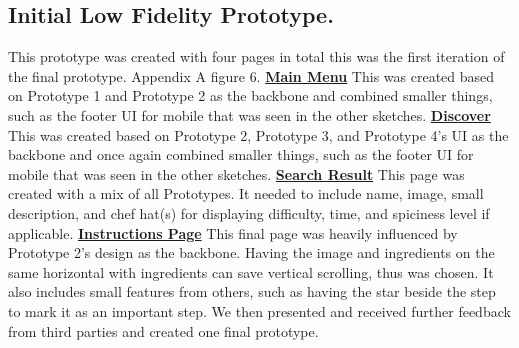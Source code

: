 \documentclass[11pt,english]{article}
\begin{document}
\subsection{Initial Low Fidelity Prototype.}
This prototype was created with four pages in total this was the first iteration of the final prototype. Appendix A figure 6. 
\newline
\newline
\textbf{\underline{Main Menu}}
\newline
\newline
This was created based on Prototype 1 and Prototype 2 as the backbone and combined smaller things, such as the footer UI for mobile that was seen in the other sketches.
\newline
\newline
\textbf{\underline{Discover}}
\newline
\newline
This was created based on Prototype 2, Prototype 3, and Prototype 4’s UI as the backbone and once again combined smaller things, such as the footer UI for mobile that was seen in the other sketches. 
\newline
\newline
\textbf{\underline{Search Result}}
\newline
\newline
This page was created with a mix of all Prototypes. It needed to include name, image, small description, and chef hat(s) for displaying difficulty, time, and spiciness level if applicable.
\newline
\newline
\textbf{\underline{Instructions Page}}
\newline
\newline
This final page was heavily influenced by Prototype 2’s design as the backbone. Having the image and ingredients on the same horizontal with ingredients can save vertical scrolling, thus was chosen. It also includes small features from others, such as having the star beside the step to mark it as an important step.
\newline
\newline
We then presented and received further feedback from third parties and created one final prototype.
\newline
\newline
\newpage
\end{document}
